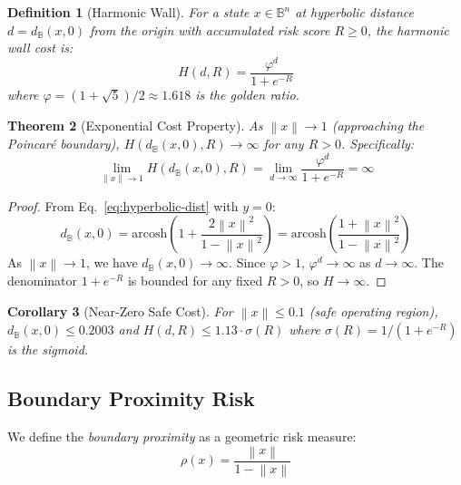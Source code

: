 \documentclass[11pt,a4paper]{article}
\newtheorem{theorem}{Theorem}[section]
\newtheorem{corollary}[theorem]{Corollary}
\newtheorem{definition}[theorem]{Definition}
\newcommand{\BB}{\mathbb{B}}
\newcommand{\norm}[1]{\left\|#1\right\|}
\newcommand{\golden}{\varphi}
\begin{document}
\begin{definition}[Harmonic Wall]
For a state $x \in \BB^n$ at hyperbolic distance $d = d_\BB(x, 0)$
from the origin with accumulated risk score $R \geq 0$, the
\emph{harmonic wall} cost is:
\begin{equation}
  H(d, R) = \frac{\golden^d}{1 + e^{-R}}
  \label{eq:harmonic-wall}
\end{equation}
where $\golden = (1 + \sqrt{5})/2 \approx 1.618$ is the golden ratio.
\end{definition}

\begin{theorem}[Exponential Cost Property]
\label{thm:expwall}
As $\norm{x} \to 1$ (approaching the Poincar\'{e} boundary),
$H(d_\BB(x, 0), R) \to \infty$ for any $R > 0$. Specifically:
\begin{equation}
  \lim_{\norm{x} \to 1} H(d_\BB(x, 0), R)
  = \lim_{d \to \infty} \frac{\golden^d}{1 + e^{-R}} = \infty
\end{equation}
\end{theorem}

\begin{proof}
From Eq.~\eqref{eq:hyperbolic-dist} with $y = 0$:
\begin{equation}
  d_\BB(x, 0) = \text{arcosh}\left(1 + \frac{2\norm{x}^2}{1 - \norm{x}^2}\right)
  = \text{arcosh}\left(\frac{1 + \norm{x}^2}{1 - \norm{x}^2}\right)
\end{equation}
As $\norm{x} \to 1$, we have $d_\BB(x, 0) \to \infty$.
Since $\golden > 1$, $\golden^d \to \infty$ as $d \to \infty$.
The denominator $1 + e^{-R}$ is bounded for any fixed $R > 0$,
so $H \to \infty$.
\end{proof}

\begin{corollary}[Near-Zero Safe Cost]
For $\norm{x} \leq 0.1$ (safe operating region),
$d_\BB(x, 0) \leq 0.2003$ and $H(d, R) \leq 1.13 \cdot \sigma(R)$
where $\sigma(R) = 1/(1 + e^{-R})$ is the sigmoid.
\end{corollary}

\subsection{Boundary Proximity Risk}

We define the \emph{boundary proximity} as a geometric risk measure:
\begin{equation}
  \rho(x) = \frac{\norm{x}}{1 - \norm{x}}
\end{equation}
\end{document}
